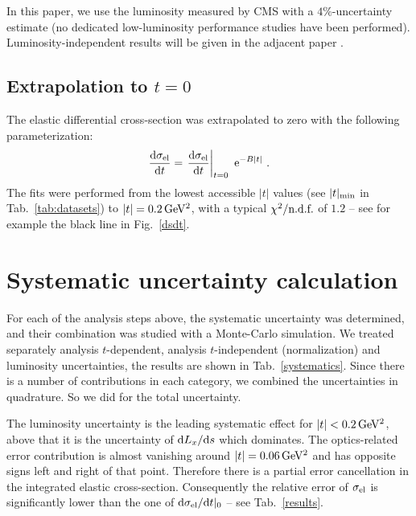 \documentclass[doublecol]{../macros/epl2}
\def\d{{\rm d}}
\def\un#1{\,{\rm #1}}
\def\e{{\rm e}}
\begin{document}
In this paper, we use the luminosity measured by CMS with a $4\%$-uncertainty estimate (no dedicated low-luminosity performance studies have been performed). Luminosity-independent results will be given in the adjacent paper \cite{P3}.


\subsection{Extrapolation to $t=0$}

The elastic differential cross-section was extrapolated to zero with the following parameterization:
\begin{equation}
\label{eq:extrapolation}
{\d\sigma_{\rm el}\over \d t} = \left. {\d\sigma_{\rm el}\over \d t}\right|_{t=0} \ \e^{-B|t|}\ .
\end{equation}
The fits were performed from the lowest accessible $|t|$ values (see $|t|_{\rm min}$ in Tab.~\ref{tab:datasets}) to $|t| = 0.2\un{GeV^2}$, with a typical $\chi^2/\hbox{n.d.f.}$ of $1.2$ -- see for example the black line in Fig.~\ref{dsdt}.

\section{Systematic uncertainty calculation}


For each of the analysis steps above, the systematic uncertainty was determined, and their combination was studied with a Monte-Carlo simulation. We treated separately analysis $t$-dependent, analysis $t$-independent (normalization) and luminosity uncertainties, the results are shown in Tab.~\ref{systematics}. Since there is a number of contributions in each category, we combined the uncertainties in quadrature. So we did for the total uncertainty.

The luminosity uncertainty is the leading systematic effect for $|t| < 0.2\un{GeV^2}$, above that it is the uncertainty of $\d L_x/\d s$ which dominates. The optics-related error contribution is almost vanishing around $|t| = 0.06\un{GeV^2}$ and has opposite signs left and right of that point. Therefore there is a partial error cancellation in the integrated elastic cross-section. Consequently the relative error of $\sigma_{\rm el}$ is significantly lower than the one of $\d\sigma_{\rm el}/\d t|_0$ -- see Tab.~\ref{results}.
\end{document}
